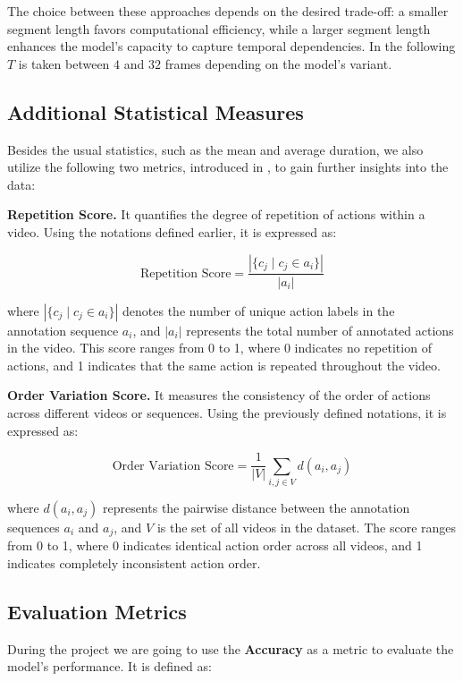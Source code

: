 The choice between these approaches depends on the desired trade-off: a smaller segment length favors computational efficiency, while a larger segment length enhances the model's capacity to capture temporal dependencies. In the following $T$ is taken between $4$ and $32$ frames depending on the model's variant.

\subsection{Additional Statistical Measures}

Besides the usual statistics, such as the mean and average duration, we also utilize the following two metrics, introduced in \cite{tas-survey}, to gain further insights into the data:

\noindent\textbf{Repetition Score.}  
It quantifies the degree of repetition of actions within a video. Using the notations defined earlier, it is expressed as:  

\[
\text{Repetition Score} = \frac{|\{c_j \mid c_j \in a_i\}|}{|a_i|}
\]

where \( |\{c_j \mid c_j \in a_i\}| \) denotes the number of unique action labels in the annotation sequence \( a_i \), and \( |a_i| \) represents the total number of annotated actions in the video. This score ranges from 0 to 1, where 0 indicates no repetition of actions, and 1 indicates that the same action is repeated throughout the video.

\noindent\textbf{Order Variation Score.}  
It measures the consistency of the order of actions across different videos or sequences. Using the previously defined notations, it is expressed as:  

\[
\text{Order Variation Score} = \frac{1}{|V|} \sum_{i, j \in V} d(a_i, a_j)
\]

where \(d(a_i, a_j)\) represents the pairwise distance between the annotation sequences \(a_i\) and \(a_j\), and \(V\) is the set of all videos in the dataset. The score ranges from 0 to 1, where 0 indicates identical action order across all videos, and 1 indicates completely inconsistent action order.  

\subsection{Evaluation Metrics}

During the project we are going to use the \textbf{Accuracy} as a metric to evaluate the model's performance. It is defined as:

